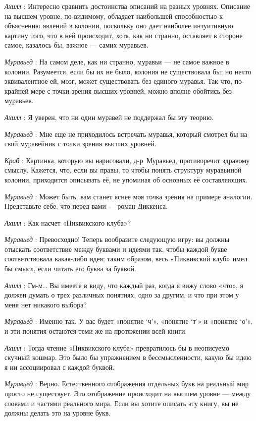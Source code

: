 \documentclass[../main.tex]{subfiles}
\begin{document}
\begin{dialogue}
\emph{Ахилл} : Интересно сравнить достоинства описаний на разных уровнях. Описание на высшем уровне, по-видимому, обладает наибольшей способностью к объяснению явлений в колонии, поскольку оно дает наиболее интуитивную картину того, что в ней происходит, хотя, как ни странно, оставляет в стороне самое, казалось бы, важное --- самих муравьев.

\emph{Муравьед} : На самом деле, как ни странно, муравьи --- не самое важное в колонии. Разумеется, если бы их не было, колония не существовала бы; но нечто эквивалентное ей, мозг, может существовать без единого муравья. Так что, по-крайней мере с точки зрения высших уровней, можно вполне обойтись без муравьев.

\emph{Ахилл} : Я уверен, что ни один муравей не поддержал бы эту теорию.

\emph{Муравьед} : Мне еще не приходилось встречать муравья, который смотрел бы на свой муравейник с точки зрения высших уровней.

\emph{Краб} : Картинка, которую вы нарисовали, д-р~Муравьед, противоречит здравому смыслу. Кажется, что, если вы правы, то чтобы понять структуру муравьиной колонии, приходится описывать её, не упоминая об основных её составляющих.

\emph{Муравьед} : Может быть, вам станет яснее моя точка зрения на примере аналогии. Представьте себе, что перед вами --- роман Диккенса.

\emph{Ахилл} : Как насчет «Пиквикского клуба»?

\emph{Муравьед} : Превосходно! Теперь вообразите следующую игру: вы должны отыскать соответствие между буквами и идеями так, чтобы каждой букве соответствовала какая-либо идея; таким образом, весь «Пиквикский клуб» имел бы смысл, если читать его буква за буквой.

\emph{Ахилл} : Гм-м\ldots{} Вы имеете в виду, что каждый раз, когда я вижу слово «что», я должен думать о трех различных понятиях, одно за другим, и что при этом у меня нет никакого выбора?

\emph{Муравьед} : Именно так. У вас будет «понятие \enquote*{ч}», «понятие \enquote*{т}» и «понятие \enquote*{о}», и эти понятия остаются теми же на протяжении всей книги.

\emph{Ахилл} : Тогда чтение «Пиквикского клуба» превратилось бы в неописуемо скучный кошмар. Это было бы упражнением в бессмысленности, какую бы идею я ни ассоциировал с каждой буквой.

\emph{Муравьед} : Верно. Естественного отображения отдельных букв на реальный мир просто не существует. Это отображение происходит на высшем уровне --- между словами и частями реального мира. Если вы хотите описать эту книгу, вы не должны делать это на уровне букв.


\end{dialogue}
\end{document}

